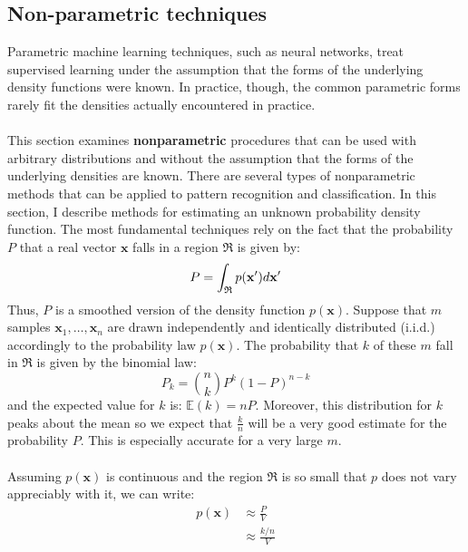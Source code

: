 	\subsection{Non-parametric techniques}	\label{Section 2.2.5}
	Parametric machine learning techniques, such as neural networks, treat supervised learning under the assumption that the forms of the underlying density functions were known. In practice, though, the common parametric forms rarely fit the densities actually encountered in practice. 
	\\ \\
	This section examines \textbf{nonparametric} procedures that can be used with arbitrary distributions and without the assumption that the forms of the underlying densities are known. There are several types of nonparametric methods that can be applied to pattern recognition and classification. In this section, I describe methods for estimating an unknown probability density function. The most fundamental techniques rely on the fact that the probability $P$ that a real vector $\mathbf{x}$ falls in a region $\mathfrak{R}$ is given by:
	\begin{equation}
		\centering
		P = \int_{\mathfrak{R}} p(\mathbf{x'}) d\mathbf{x'}
	\end{equation}
	Thus, $P$ is a smoothed version of the density function $p(\mathbf{x})$. Suppose that $m$ samples $\mathbf{x}_1,\dots ,\mathbf{x}_n$ are drawn independently and identically distributed (i.i.d.) accordingly to the probability law $p(\mathbf{x})$. The probability that $k$ of these $m$ fall in $\mathfrak{R}$ is given by the binomial law:
	\begin{equation}
		P_k = {n\choose k} P^k (1-P)^{n-k}
	\end{equation}
	and the expected value for $k$ is: $\mathbb{E}(k) = nP$. Moreover, this distribution for $k$ peaks about the mean so we expect that $\frac{k}{n}$ will be a very good estimate for the probability $P$. This is especially accurate for a very large $m$. 
	\\ \\
	Assuming $p(\mathbf{x})$ is continuous and the region $\mathfrak{R}$ is so small that $p$ does not vary appreciably with it, we can write:
	\begin{equation}
		 \begin{split}
p(\mathbf{x}) &\approx \frac{P}{V} \\
&\approx \frac{k / n}{V}
\end{split}	
	\label{Eq-np 1}
	\end{equation}
